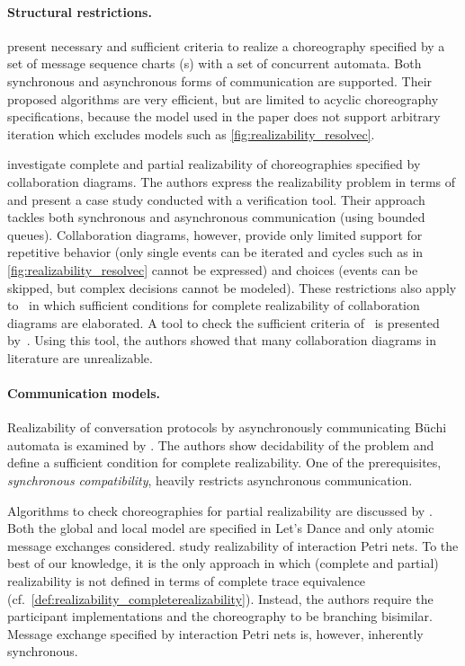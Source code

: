 \paragraph{Structural restrictions.}

\citet{AlurEY_2003_tse} present necessary and sufficient criteria to realize a choreography specified by a set of message sequence charts (s) with a set of concurrent automata. Both synchronous and asynchronous forms of communication are supported. Their proposed algorithms are very efficient, but are limited to acyclic choreography specifications, because the  model used in the paper does not support arbitrary iteration which excludes models such as \autoref{fig:realizability_resolvec}.

\citet{SalaunB_2009_ifm} investigate complete and partial realizability of choreographies specified by collaboration diagrams. The authors express the realizability problem in terms of  and present a case study conducted with a  verification tool. Their approach tackles both synchronous and asynchronous communication (using bounded  queues). Collaboration diagrams, however, provide only limited support for repetitive behavior (only single events can be iterated and cycles such as in \autoref{fig:realizability_resolvec} cannot be expressed) and choices (events can be skipped, but complex decisions cannot be modeled). These restrictions also apply to~\cite{BultanF_2008_soca} in which sufficient conditions for complete realizability of collaboration diagrams are elaborated. A tool to check the sufficient criteria of~\cite{BultanF_2008_soca,FuBS_2004_tcs,FuBS_2005_tse} is presented by~\citet{BultanFF_2009_icws}. Using this tool, the authors showed that many collaboration diagrams in literature are unrealizable.


\paragraph{Communication models.}

Realizability of conversation protocols by asynchro\-nously communicating B\"uchi automata is examined by \citet{FuBS_2004_tcs}. The authors show decidability of the problem and define a sufficient condition for complete realizability. One of the prerequisites, \emph{synchronous compatibility}, heavily restricts asynchronous communication.

Algorithms to check choreographies for partial realizability are discussed by \citet{ZahaDHBD_2006_edoc}. Both the global and local model are specified in Let's Dance and only atomic message exchanges considered. \citet{DeckerW_2007_bpm} study realizability of interaction Petri nets. To the best of our knowledge, it is the only approach in which (complete and partial) realizability is not defined in terms of complete trace equivalence (cf.\ \autoref{def:realizability_completerealizability}). Instead, the authors require the participant implementations and the choreography to be branching bisimilar. Message exchange specified by interaction Petri nets is, however, inherently synchronous.

